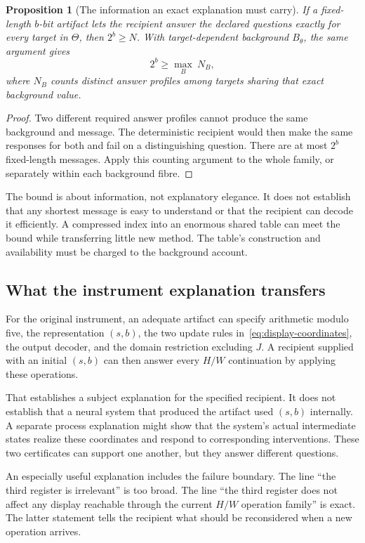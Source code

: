\documentclass[11pt,letterpaper]{article}
\theoremstyle{plain}
\newtheorem{proposition}[theorem]{Proposition}
\theoremstyle{definition}
\begin{document}
\begin{proposition}[The information an exact explanation must carry]\label{prop:explanation}
If a fixed-length $b$-bit artifact lets the recipient answer the declared questions exactly for every target in $\Theta$, then $2^b\geq N$. With target-dependent background $B_\theta$, the same argument gives
\[
2^b\geq\max_{B}\ N_B,
\]
where $N_B$ counts distinct answer profiles among targets sharing that exact background value.
\end{proposition}
\begin{proof}
Two different required answer profiles cannot produce the same background and message. The deterministic recipient would then make the same responses for both and fail on a distinguishing question. There are at most $2^b$ fixed-length messages. Apply this counting argument to the whole family, or separately within each background fibre.
\end{proof}
The bound is about information, not explanatory elegance. It does not establish that any shortest message is easy to understand or that the recipient can decode it efficiently. A compressed index into an enormous shared table can meet the bound while transferring little new method. The table's construction and availability must be charged to the background account.

\subsection{What the instrument explanation transfers}
For the original instrument, an adequate artifact can specify arithmetic modulo five, the representation $(s,b)$, the two update rules in~\eqref{eq:display-coordinates}, the output decoder, and the domain restriction excluding $J$. A recipient supplied with an initial $(s,b)$ can then answer every $H/W$ continuation by applying these operations.

That establishes a subject explanation for the specified recipient. It does not establish that a neural system that produced the artifact used $(s,b)$ internally. A separate process explanation might show that the system's actual intermediate states realize these coordinates and respond to corresponding interventions. These two certificates can support one another, but they answer different questions.

An especially useful explanation includes the failure boundary. The line ``the third register is irrelevant'' is too broad. The line ``the third register does not affect any display reachable through the current $H/W$ operation family'' is exact. The latter statement tells the recipient what should be reconsidered when a new operation arrives.
\end{document}

